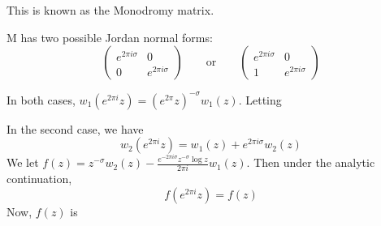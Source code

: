\documentclass[a4paper]{article}
\begin{document}
This is known as the Monodromy matrix.

M has two possible Jordan normal forms:
\[
	\begin{pmatrix} e^{2\pi i \sigma} & 0 \\ 0 & e^{2\pi i \sigma} \end{pmatrix} \qquad \text{or} \qquad \begin{pmatrix} e^{2\pi i \sigma} & 0 \\ 1 & e^{2\pi i \sigma} \end{pmatrix} 
\] 

In both cases, $w_1\left(e^{2\pi i} z\right) = \left(e^{2\pi}z\right)^{-\sigma} w_1(z)$. Letting 

In the second case, we have
\[
	w_2\left( e^{2\pi i }z \right) = w_1(z) + e^{2\pi i \sigma} w_2(z)
\]
We let $f(z) = z^{-\sigma} w_2(z) - \frac{e^{-2\pi i \sigma}z^{-\sigma} \log z}{2\pi i} w_1(z)$. Then under the analytic continuation, 
\[
	f\left( e^{2\pi i} z \right) = f(z)
\] 
Now, $f(z)$ is 
\end{document}
